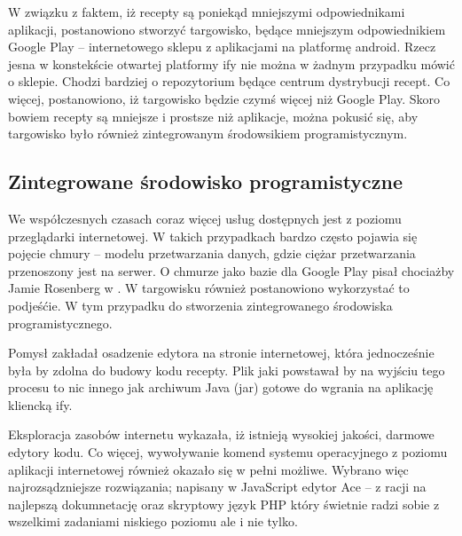 \documentclass[11pt,a4paper,polish,thesis]{dcsbook}
\begin{document}
W związku z faktem, iż recepty są poniekąd mniejszymi odpowiednikami aplikacji, postanowiono stworzyć targowisko, będące mniejszym odpowiednikiem Google Play
-- internetowego sklepu z aplikacjami na platformę android. Rzecz jesna w konstekście otwartej platformy if{y} nie można w żadnym przypadku mówić o sklepie. Chodzi
bardziej o repozytorium będące centrum dystrybucji recept. Co więcej, postanowiono, iż targowisko będzie czymś więcej niż Google Play. Skoro bowiem recepty są
mniejsze i prostsze niż aplikacje, można pokusić się, aby targowisko było również zintegrowanym środowsikiem programistycznym.
\subsection{Zintegrowane środowisko programistyczne}
We współczesnych czasach coraz więcej usług dostępnych jest z poziomu przeglądarki internetowej. W takich przypadkach bardzo często pojawia się pojęcie chmury --
modelu przetwarzania danych, gdzie ciężar przetwarzania przenoszony jest na serwer. O chmurze jako bazie dla Google Play pisał chociażby Jamie Rosenberg w
\cite{googleplay}. W targowisku również postanowiono wykorzystać to podjeśćie. W tym przypadku do stworzenia zintegrowanego środowiska programistycznego.

Pomysł zakładał osadzenie edytora na stronie internetowej, która jednocześnie była by zdolna do budowy kodu recepty. Plik jaki powstawał by na wyjściu tego procesu to
nic innego jak archiwum Java (jar) gotowe do wgrania na aplikację kliencką if{y}.

Eksploracja zasobów internetu wykazała, iż istnieją wysokiej jakości, darmowe edytory kodu. Co więcej, wywoływanie komend systemu operacyjnego z poziomu aplikacji
internetowej również okazało się w pełni możliwe. Wybrano więc najrozsądzniejsze rozwiązania; napisany w JavaScript edytor Ace -- z racji na najlepszą dokumnetację
oraz skryptowy język PHP który świetnie radzi sobie z wszelkimi zadaniami niskiego poziomu ale i nie tylko. %
\end{document}
